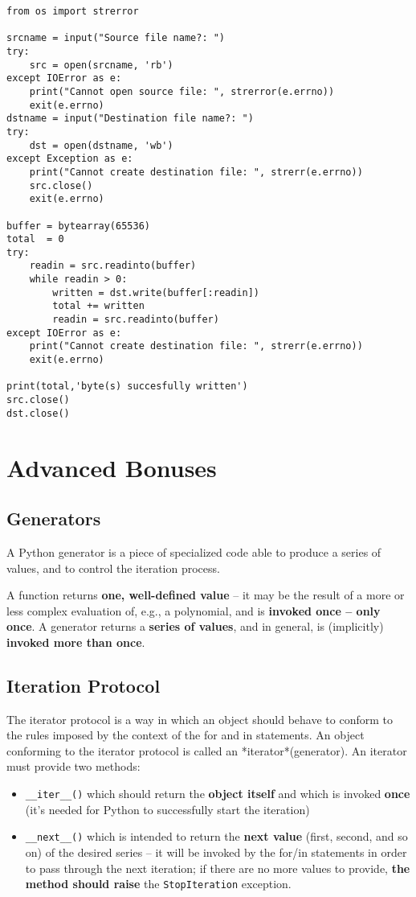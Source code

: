 \documentclass[11pt]{article}
\begin{document}
\begin{verbatim}
from os import strerror

srcname = input("Source file name?: ")
try:
	src = open(srcname, 'rb')
except IOError as e:
	print("Cannot open source file: ", strerror(e.errno))
	exit(e.errno)	
dstname = input("Destination file name?: ")
try:
	dst = open(dstname, 'wb')
except Exception as e:
	print("Cannot create destination file: ", strerr(e.errno))
	src.close()
	exit(e.errno)	

buffer = bytearray(65536)
total  = 0
try:
	readin = src.readinto(buffer)
	while readin > 0:
		written = dst.write(buffer[:readin])
		total += written
		readin = src.readinto(buffer)
except IOError as e:
	print("Cannot create destination file: ", strerr(e.errno))
	exit(e.errno)	

print(total,'byte(s) succesfully written')
src.close()
dst.close()
\end{verbatim}

\newpage

\section{Advanced Bonuses}
\label{sec:org6e2bbfb}
\subsection{Generators}
\label{sec:org4a5010f}
A Python generator is a piece of specialized code able to produce a
series of values, and to control the iteration process.

A function returns \textbf{one, well-defined value} – it may be the result of
a more or less complex evaluation of, e.g., a polynomial, and is
\textbf{invoked once – only once}.  A generator returns a \textbf{series of values}, and
in general, is (implicitly) \textbf{invoked more than once}.
\subsection{Iteration Protocol}
\label{sec:org0736f67}
The iterator protocol is a way in which an object should behave to
conform to the rules imposed by the context of the for and in
statements. An object conforming to the iterator protocol is called an
*iterator*(generator). An iterator must provide two methods:

\begin{itemize}
\item \texttt{\_\_iter\_\_()} which should return the \textbf{object itself} and which is
invoked \textbf{once} (it’s needed for Python to successfully start the
iteration)

\item \texttt{\_\_next\_\_()} which is intended to return the \textbf{next value} (first,
second, and so on) of the desired series – it will be invoked by the
for/in statements in order to pass through the next iteration; if
there are no more values to provide, \textbf{the method should raise} the
\texttt{StopIteration} exception.
\end{itemize}
\end{document}
